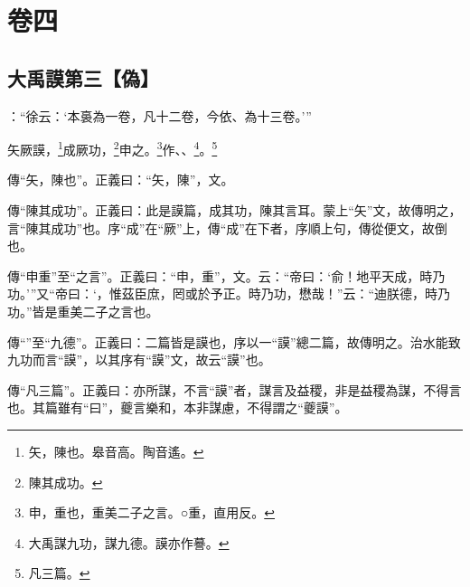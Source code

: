 

\chapter{卷四}


\section{大禹謨第三【偽】}


 {\noindent{}\fzbyks {}：“徐云：‘本裛為一卷，凡十二卷，今依、為十三卷。’” \par}

\textcolor{red}{}矢厥謨，\footnote{矢，陳也。皋音高。陶音遙。}成厥功，\footnote{陳其成功。}申之。\footnote{申，重也，重美二子之言。○重，直用反。}作、、\footnote{大禹謀九功，謀九德。謨亦作謩。}\CJKunderwave{\textcolor{red}{益稷}}。\footnote{凡三篇。}

{\noindent\zhuan{}\fzbyks 傳“矢，陳也”。正義曰：“矢，陳”，文。 \par}

{\noindent\zhuan{}\fzbyks 傳“陳其成功”。正義曰：此是謨篇，成其功，陳其言耳。蒙上“矢”文，故傳明之，言“陳其成功”也。序“成”在“厥”上，傳“成”在下者，序順上句，傳從便文，故倒也。 \par}

{\noindent\zhuan{}\fzbyks 傳“申重”至“之言”。正義曰：“申，重”，文。云：“帝曰：‘俞！地平天成，時乃功。’”又“帝曰：‘，惟茲臣庶，罔或於予正。時乃功，懋哉！”云：“迪朕德，時乃功。”皆是重美二子之言也。 \par}

{\noindent\zhuan{}\fzbyks 傳“”至“九德”。正義曰：二篇皆是謨也，序以一“謨”總二篇，故傳明之。治水能致九功而言“謨”，以其序有“謨”文，故云“謨”也。 \par}

{\noindent\zhuan{}\fzbyks 傳“凡三篇”。正義曰：亦所謀，不言“謨”者，謀言及益稷，非是益稷為謀，不得言也。其篇雖有“曰”，夔言樂和，本非謀慮，不得謂之“夔謨”。 \par}

